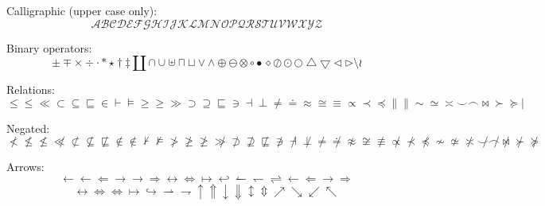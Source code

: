 \documentclass[12pt,a4paper,onecolumn]{article}
\begin{document}
Calligraphic (upper case only):
\begin{equation}
\mathcal{A}  \mathcal{B}  \mathcal{C}  \mathcal{D}  \mathcal{E}  \mathcal{F}  \mathcal{G}  \mathcal{H}  \mathcal{I}  \mathcal{J}  \mathcal{K}  \mathcal{L}  \mathcal{M}  \mathcal{N}  \mathcal{O}  \mathcal{P}  \mathcal{Q}  \mathcal{R}  \mathcal{S}  \mathcal{T}  \mathcal{U}  \mathcal{V}  \mathcal{W}  \mathcal{X}  \mathcal{Y}  \mathcal{Z}
\end{equation}

Binary operators:
\begin{equation}
\pm \mp \times \div \cdot \ast \star \dagger \ddagger \amalg \cap \cup \uplus \sqcap \sqcup \vee \wedge \oplus \ominus \otimes \circ \bullet \diamond \oslash \odot \bigcirc \bigtriangleup \bigtriangledown \triangleleft \triangleright \setminus \wr
\end{equation}

Relations:
\begin{equation}
\le \leq \ll \subset \subseteq \sqsubseteq \in \vdash \models \ge \geq \gg \supset \supseteq \sqsubseteq \ni \dashv \perp \neq \doteq \approx \cong \equiv \propto \prec \preceq \parallel \| \sim \simeq \asymp \smile \frown \bowtie \succ \succeq \mid
\end{equation}

Negated:
\begin{equation}
\not< \not\le \not\leq \not\ll \not\subset \not\subseteq \not\sqsubseteq \not\in \notin \not\vdash \not\models \not> \not\ge \not\geq \not\gg \not\supset \not\supseteq \not\sqsubseteq \not\ni \not\dashv \not\perp \not= \not\doteq \not\approx \not\cong \not\equiv \not\propto \not\prec \not\preceq \not\sim \not\simeq \not\asymp \not\smile \not\frown \not\bowtie \not\succ \not\succeq
\end{equation}

Arrows:
\begin{equation}
\leftarrow \gets \Leftarrow \rightarrow \to \Rightarrow \leftrightarrow \Leftrightarrow \mapsto \hookleftarrow \leftharpoonup \leftharpoondown \rightleftharpoons \longleftarrow \Longleftarrow \longrightarrow \Longrightarrow 
\end{equation}
\begin{equation}
\longleftrightarrow \Longleftrightarrow \iff \longmapsto \hookrightarrow \rightharpoonup \rightharpoondown \uparrow \Uparrow \downarrow \Downarrow \updownarrow \Updownarrow \nearrow \searrow \swarrow \nwarrow
\end{equation}
\end{document}
